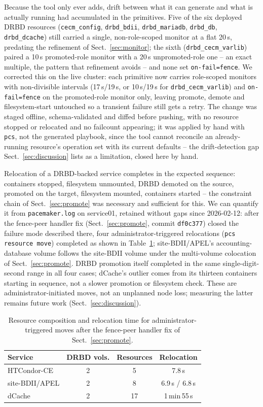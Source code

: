 \documentclass{webofc}
\begin{document}
Because the tool only ever adds, drift between what it can generate and
what is actually running had accumulated in the primitives. Five of the
six deployed DRBD resources (\texttt{cecm\_config}, \texttt{drbd\_bdii},
\texttt{drbd\_mariadb}, \texttt{drbd\_db}, \texttt{drbd\_dcache}) still
carried a single, non-role-scoped monitor at a flat 20\,s, predating the
refinement of Sect.~\ref{sec:monitor}; the sixth
(\texttt{drbd\_cecm\_varlib}) paired a 10\,s promoted-role monitor with a
20\,s unpromoted-role one -- an exact multiple, the pattern that
refinement avoids -- and none set \texttt{on-fail=fence}. We corrected
this on the live cluster: each primitive now carries role-scoped
monitors with non-divisible intervals (17\,s/19\,s, or 10\,s/19\,s for
\texttt{drbd\_cecm\_varlib}) and \texttt{on-fail=fence} on the
promoted-role monitor only, leaving promote, demote and filesystem-start
untouched so a transient failure still gets a retry. The change was
staged offline, schema-validated and diffed before pushing, with no
resource stopped or relocated and no failcount appearing; it was applied
by hand with \texttt{pcs}, not the generated playbook, since the tool
cannot reconcile an already-running resource's operation set with its
current defaults -- the drift-detection gap Sect.~\ref{sec:discussion}
lists as a limitation, closed here by hand.

Relocation of a DRBD-backed service completes in the expected sequence:
containers stopped, filesystem unmounted, DRBD demoted on the source,
promoted on the target, filesystem mounted, containers started -- the
constraint chain of Sect.~\ref{sec:promote} was necessary and sufficient
for this. We can quantify it from \texttt{pacemaker.log} on service01,
retained without gaps since 2026-02-12: after the fence-peer handler fix
(Sect.~\ref{sec:promote}, commit \texttt{df0c377}) closed the failure
mode described there, four administrator-triggered relocations
(\texttt{pcs resource move}) completed as shown in
Table~\ref{tab:failover}; site-BDII/APEL's accounting-database volume
follows the site-BDII volume under the multi-volume colocation of
Sect.~\ref{sec:promote}. DRBD promotion itself completed in the same
single-digit-second range in all four cases; dCache's outlier comes from
its thirteen containers starting in sequence, not a slower promotion or
filesystem check. These are administrator-initiated moves, not an
unplanned node loss; measuring the latter remains future work
(Sect.~\ref{sec:discussion}).

\begin{table}[h]
\centering
\caption{Resource composition and relocation time for
administrator-triggered moves after the fence-peer handler fix of
Sect.~\ref{sec:promote}.}
\label{tab:failover}
\begin{tabular}{lccc}
\hline
Service & DRBD vols. & Resources & Relocation \\\hline
HTCondor-CE     & 2 & 5  & 7.8\,s \\
site-BDII/APEL  & 2 & 8  & 6.9\,s / 6.8\,s \\
dCache          & 2 & 17 & 1\,min\,55\,s \\\hline
\end{tabular}
\end{table}
\end{document}
